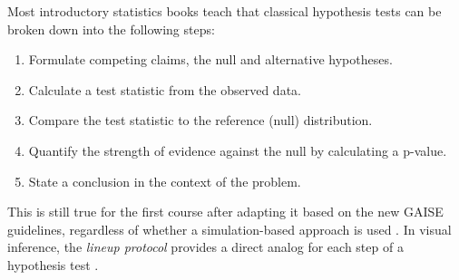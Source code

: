 \documentclass[12pt]{article}
\providecommand{\tightlist}{%
  \setlength{\itemsep}{0pt}\setlength{\parskip}{0pt}}
\begin{document}
\label{sec:vizinf}

Most introductory statistics books teach that classical hypothesis tests
can be broken down into the following steps:

\begin{enumerate}
\def\labelenumi{\arabic{enumi}.}
\tightlist
\item
  Formulate competing claims, the null and alternative hypotheses.
\item
  Calculate a test statistic from the observed data.
\item
  Compare the test statistic to the reference (null) distribution.
\item
  Quantify the strength of evidence against the null by calculating a
  p-value.
\item
  State a conclusion in the context of the problem.
\end{enumerate}

\noindent This is still true for the first course after adapting it
based on the new GAISE guidelines, regardless of whether a
simulation-based approach is used
\citep{Lock2017, tintle2015, introstats}. In visual inference, the
\emph{lineup protocol} provides a direct analog for each step of a
hypothesis test \citep{Buja-2009bd}.
\end{document}
